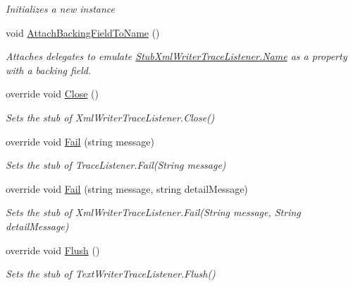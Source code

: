 \begin{DoxyCompactItemize}
\begin{DoxyCompactList}\small\item\em Initializes a new instance\end{DoxyCompactList}\item 
void \hyperlink{class_system_1_1_diagnostics_1_1_fakes_1_1_stub_xml_writer_trace_listener_a199cd4b19a7de6c8516903a56c80fdeb}{Attach\-Backing\-Field\-To\-Name} ()
\begin{DoxyCompactList}\small\item\em Attaches delegates to emulate \hyperlink{class_system_1_1_diagnostics_1_1_fakes_1_1_stub_xml_writer_trace_listener_a8893f0382f609c4adf97e03f3fa579b7}{Stub\-Xml\-Writer\-Trace\-Listener.\-Name} as a property with a backing field.\end{DoxyCompactList}\item 
override void \hyperlink{class_system_1_1_diagnostics_1_1_fakes_1_1_stub_xml_writer_trace_listener_a5c6467388334be6281f526866aba0ee2}{Close} ()
\begin{DoxyCompactList}\small\item\em Sets the stub of Xml\-Writer\-Trace\-Listener.\-Close()\end{DoxyCompactList}\item 
override void \hyperlink{class_system_1_1_diagnostics_1_1_fakes_1_1_stub_xml_writer_trace_listener_a4c4b8d41e898cb987aad75abf6d6098b}{Fail} (string message)
\begin{DoxyCompactList}\small\item\em Sets the stub of Trace\-Listener.\-Fail(\-String message)\end{DoxyCompactList}\item 
override void \hyperlink{class_system_1_1_diagnostics_1_1_fakes_1_1_stub_xml_writer_trace_listener_aca4700f9cf9a73f8476d224508f4411f}{Fail} (string message, string detail\-Message)
\begin{DoxyCompactList}\small\item\em Sets the stub of Xml\-Writer\-Trace\-Listener.\-Fail(\-String message, String detail\-Message)\end{DoxyCompactList}\item 
override void \hyperlink{class_system_1_1_diagnostics_1_1_fakes_1_1_stub_xml_writer_trace_listener_a470fea4537d6e7f61e430cffe832e7b6}{Flush} ()
\begin{DoxyCompactList}\small\item\em Sets the stub of Text\-Writer\-Trace\-Listener.\-Flush()\end{DoxyCompactList}\item 

\end{DoxyCompactItemize}
